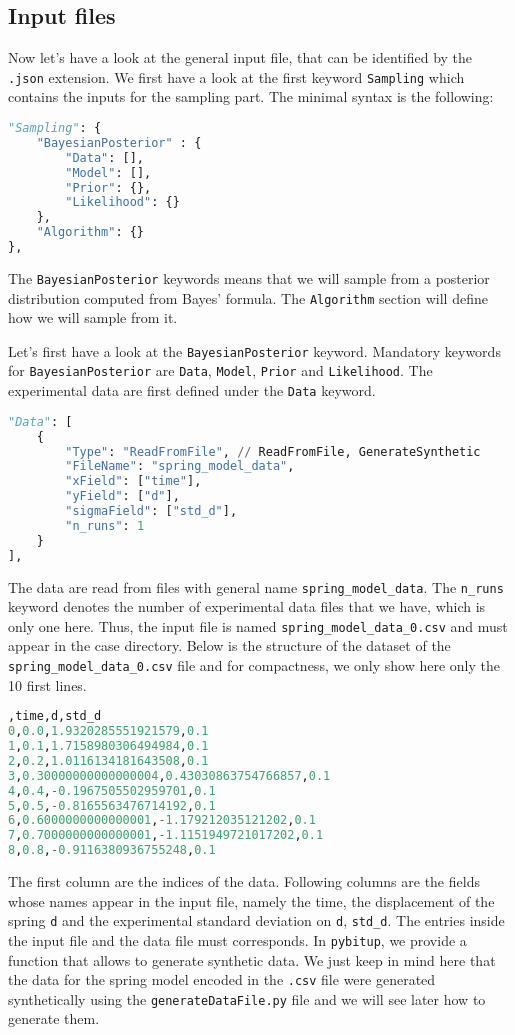 \documentclass[a4paper,11pt]{article}
\begin{document}
\subsection{Input files} 

Now let's have a look at the general input file, that can be identified by the \texttt{.json} extension. We first have a look at the first keyword \texttt{Sampling} which contains the inputs for the sampling part. The minimal syntax is the following: 
\begin{lstlisting}[language=Python, breaklines=true, tabsize=4, backgroundcolor=\color{codegray}]
"Sampling": {
    "BayesianPosterior" : {
        "Data": [],
        "Model": [],
        "Prior": {},
        "Likelihood": {}
    },
    "Algorithm": {}
}, 
\end{lstlisting}
The \texttt{BayesianPosterior} keywords means that we will sample from a posterior distribution computed from Bayes' formula. The \texttt{Algorithm} section will define how we will sample from it.

Let's first have a look at the \texttt{BayesianPosterior} keyword. Mandatory keywords for \texttt{BayesianPosterior} are \texttt{Data}, \texttt{Model}, \texttt{Prior} and \texttt{Likelihood}. The experimental data are first defined under the \texttt{Data} keyword. 
\begin{lstlisting}[language=Python, breaklines=true, tabsize=4, backgroundcolor=\color{codegray}]
"Data": [ 
    {
        "Type": "ReadFromFile", // ReadFromFile, GenerateSynthetic
        "FileName": "spring_model_data",
        "xField": ["time"], 
        "yField": ["d"], 
        "sigmaField": ["std_d"], 
        "n_runs": 1
    }
],
\end{lstlisting}
The data are read from files with general name \texttt{spring\_model\_data}. The \texttt{n\_runs} keyword denotes the number of experimental data files that we have, which is only one here. Thus, the input file is named \texttt{spring\_model\_data\_0.csv} and must appear in the case directory. Below is the structure of the dataset of the \texttt{spring\_model\_data\_0.csv} file and for compactness, we only show here only the 10 first lines. 
\begin{lstlisting}[language=Python, breaklines=true, tabsize=4, backgroundcolor=\color{codegray}]
,time,d,std_d
0,0.0,1.9320285551921579,0.1
1,0.1,1.7158980306494984,0.1
2,0.2,1.0116134181643508,0.1
3,0.30000000000000004,0.43030863754766857,0.1
4,0.4,-0.1967505502959701,0.1
5,0.5,-0.8165563476714192,0.1
6,0.6000000000000001,-1.179212035121202,0.1
7,0.7000000000000001,-1.1151949721017202,0.1
8,0.8,-0.9116380936755248,0.1
\end{lstlisting}
The first column are the indices of the data. Following columns are the fields whose names appear in the input file, namely the time, the displacement of the spring \texttt{d} and the experimental standard deviation on \texttt{d}, \texttt{std\_d}. The entries inside the input file and the data file must corresponds. In \texttt{pybitup}, we provide a function that allows to generate synthetic data. We just keep in mind here that the data for the spring model encoded in the \texttt{.csv} file were generated synthetically using the \texttt{generateDataFile.py} file and we will see later how to generate them. 
\end{document}
